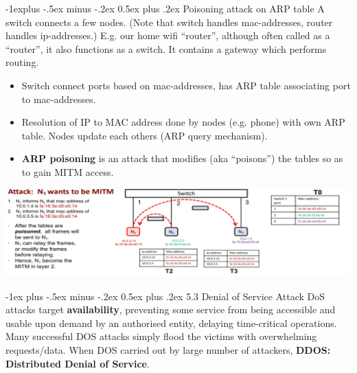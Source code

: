 \documentclass[10pt, landscape]{article}
\makeatletter
\renewcommand{\section}{\@startsection{section}{1}{0mm}%
                                {-1ex plus -.5ex minus -.2ex}%
                                {0.5ex plus .2ex}%
                                {\normalfont\large\bfseries}}
\renewcommand{\subsection}{\@startsection{subsection}{2}{0mm}%
                                {-1explus -.5ex minus -.2ex}%
                                {0.5ex plus .2ex}%
                                {\normalfont\normalsize\bfseries}}
\makeatother
\begin{document}
\begin{multicols*}{3}
\subsection{Poisoning attack on ARP table}
A switch connects a few nodes. (Note that switch handles mac-addresses, router handles ip-addresses.) E.g. our home wifi “router”, although often called as a “router”, it also functions as a switch. It contains a gateway which performs routing.
\begin{itemize}
\item Switch connect ports based on mac-addresses, has ARP table associating port to mac-addresses.
\item Resolution of IP to MAC address done by nodes (e.g. phone) with own ARP table. Nodes update each others (ARP query mechanism).
\item \textbf{ARP poisoning} is an attack that modifies (aka “poisons”) the tables so as to gain MITM access.
\end{itemize}
\centerline{\includegraphics[width=1\linewidth]{ARPPoisoning}}


\section{5.3 Denial of Service Attack}
DoS attacks target \textbf{availability}, preventing some service from being accessible and usable 
upon demand by an authorised entity, delaying time-critical operations. Many successful DOS attacks simply flood the victims with overwhelming requests/data. When DOS carried out by large number of attackers, \textbf{DDOS: Distributed Denial of Service}.


\end{multicols*}
\end{document}
